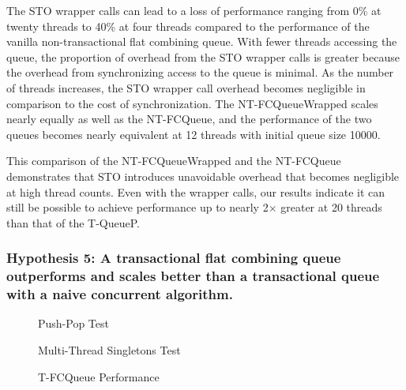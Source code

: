 The STO wrapper calls can lead to a loss of performance ranging from 0\% at twenty threads to 40\% at four threads compared to the performance of the vanilla non-transactional flat combining queue. 
 With fewer threads accessing the queue, the proportion of overhead from the STO wrapper calls is greater because the overhead from synchronizing access to the queue is minimal. As the number of threads increases, the STO wrapper call overhead becomes negligible in comparison to the cost of synchronization.
The NT-FCQueueWrapped scales nearly equally as well as the NT-FCQueue, and the performance of the two queues becomes nearly equivalent at 12 threads with initial queue size 10000.


This comparison of the NT-FCQueueWrapped and the NT-FCQueue demonstrates that STO introduces unavoidable overhead that becomes negligible at high thread counts. Even with the wrapper calls, our results indicate it can still be possible to achieve performance up to nearly 2$\times$ greater at 20 threads than that of the T-QueueP.

\vspace{12pt}
\noindent{}

\subsubsection{Hypothesis 5: A transactional flat combining queue outperforms and scales better than a transactional queue with a naive concurrent algorithm.}
\label{eval:hypo5}

\begin{figure}[H]
    \centering
	\begin{minipage}{0.75\textwidth}
        \caption*{Push-Pop Test}
        \vspace{12pt}
	\end{minipage}
   	\begin{minipage}{0.75\textwidth}
        \caption*{Multi-Thread Singletons Test}
	\end{minipage}
        \caption{T-FCQueue Performance}
    \label{fig:tqs}
\end{figure}

